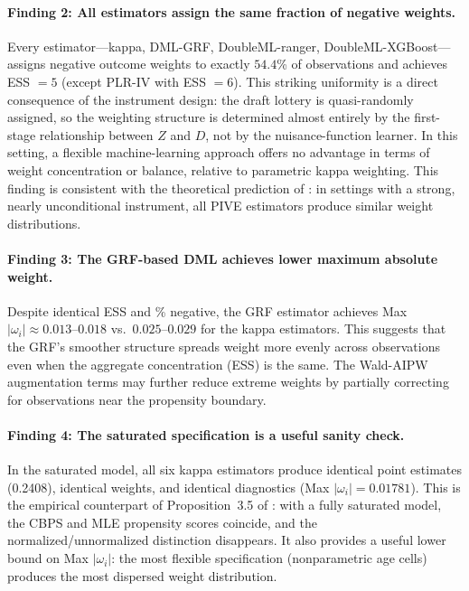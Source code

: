 \documentclass[12pt, a4paper]{article}
\begin{document}
\paragraph{Finding 2: All estimators assign the same fraction of negative weights.}
Every estimator---kappa, DML-GRF, DoubleML-ranger, DoubleML-XGBoost---assigns
negative outcome weights to exactly $54.4$\% of observations and achieves
ESS $= 5$ (except PLR-IV with ESS $= 6$). This striking uniformity is a
direct consequence of the instrument design: the draft lottery is
quasi-randomly assigned, so the weighting structure is determined almost
entirely by the first-stage relationship between $Z$ and $D$, not by the
nuisance-function learner. In this setting, a flexible machine-learning
approach offers no advantage in terms of weight concentration or balance,
relative to parametric kappa weighting. This finding is consistent with the
theoretical prediction of \citet[][Section~4.3]{knaus2024outcome}: in settings
with a strong, nearly unconditional instrument, all PIVE estimators produce
similar weight distributions.

\paragraph{Finding 3: The GRF-based DML achieves lower maximum absolute weight.}
Despite identical ESS and \% negative, the GRF estimator achieves
Max $|\omega_i| \approx 0.013$--$0.018$ vs.\ $0.025$--$0.029$ for the kappa
estimators. This suggests that the GRF's smoother structure spreads weight
more evenly across observations even when the aggregate concentration (ESS) is
the same. The Wald-AIPW augmentation terms may further reduce extreme weights
by partially correcting for observations near the propensity boundary.

\paragraph{Finding 4: The saturated specification is a useful sanity check.}
In the saturated model, all six kappa estimators produce identical point
estimates (0.2408), identical weights, and identical diagnostics
(Max $|\omega_i| = 0.01781$). This is the empirical counterpart of
Proposition~3.5 of \citet{sloczyn2025kappa}: with a fully saturated model,
the CBPS and MLE propensity scores coincide, and the normalized/unnormalized
distinction disappears. It also provides a useful lower bound on Max $|\omega_i|$:
the most flexible specification (nonparametric age cells) produces the
most dispersed weight distribution.
\end{document}
